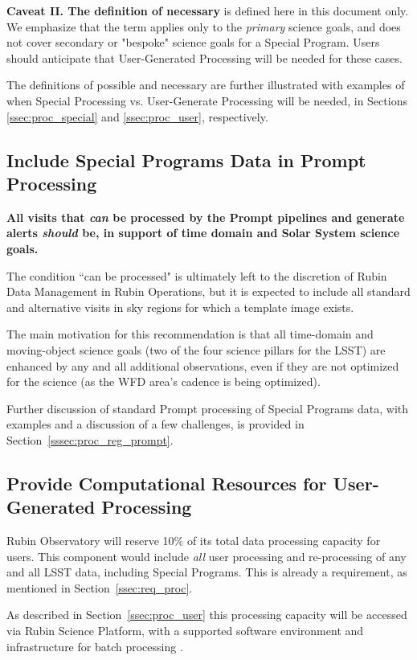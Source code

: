 \textbf{Caveat II. The definition of necessary} is defined here in this document only.
We emphasize that the term applies only to the \emph{primary} science goals, and does
not cover secondary or "bespoke" science goals for a Special Program.
Users should anticipate that User-Generated Processing will be needed for these cases.

The definitions of possible and necessary are further illustrated with examples of when
Special Processing vs. User-Generate Processing will be needed, in Sections
\ref{ssec:proc_special} and \ref{ssec:proc_user}, respectively.


\subsection{Include Special Programs Data in Prompt Processing}\label{ssec:sci_pproc}

\textbf{All visits that \emph{can} be processed by the Prompt pipelines and generate 
alerts \emph{should} be, in support of time domain and Solar System science goals.}

The condition ``can be processed" is ultimately left to the discretion of
Rubin Data Management in Rubin Operations, but it is expected to include
all standard and alternative visits in sky regions for which a template image exists.

The main motivation for this recommendation is that all time-domain and 
moving-object science goals (two of the four science pillars for the LSST) are
enhanced by any and all additional observations, even if they are not
optimized for the science (as the WFD area's cadence is being optimized).

Further discussion of standard Prompt processing of Special Programs data, with
examples and a discussion of a few challenges,
is provided in Section~\ref{sssec:proc_reg_prompt}.

\subsection{Provide Computational Resources for User-Generated Processing}\label{ssec:sci_comp}

Rubin Observatory will reserve 10\% of its total data processing capacity for users.
This component would include {\it all} user processing and re-processing of any and 
all LSST data, including Special Programs. 
This is already a requirement, as mentioned in Section~\ref{ssec:req_proc}.

As described in Section~\ref{ssec:proc_user} this processing capacity will be 
accessed via Rubin Science Platform, with a supported software environment and 
infrastructure for batch processing .

